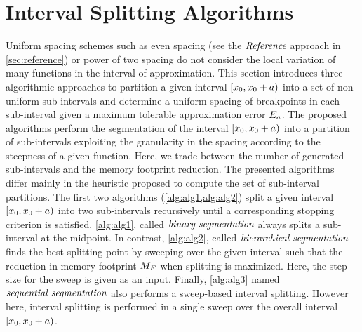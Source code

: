 \section{Interval Splitting Algorithms}
\label{sec:proposed}
Uniform spacing schemes such as even spacing (see the $\textit{Reference}$ approach in \cref{sec:reference}) or power of two spacing do not consider the local variation of many functions in the interval of approximation.
This section introduces three algorithmic approaches to  partition a given interval $[x_{0},x_{0}+a)$ into a set of non-uniform sub-intervals and determine a uniform spacing of breakpoints in each sub-interval given a maximum tolerable approximation error $E_a$.
The proposed algorithms perform the segmentation of the interval $[x_{0},x_{0}+a)$ into a partition of sub-intervals exploiting the granularity in the spacing according to the steepness of a given function.
Here, we trade between the number of generated sub-intervals and the memory footprint reduction.
The presented algorithms differ mainly in the heuristic proposed to compute the set of sub-interval partitions.
The first two algorithms (\cref{alg:alg1,alg:alg2}) split a given interval $[x_{0},x_{0}+a)$ into two sub-intervals recursively until a corresponding stopping criterion is satisfied. 
\cref{alg:alg1}, called $\textit{binary segmentation}$ always splits a sub-interval at the midpoint.
In contrast, \cref{alg:alg2}, called $\textit{hierarchical segmentation}$ finds the best splitting point by sweeping over the given interval such that the reduction in memory footprint $M_{F}$ when splitting is maximized. 
Here, the step size for the sweep is given as an input.
Finally, \cref{alg:alg3} named $\textit{sequential segmentation}$ also performs a sweep-based interval splitting. 
However here, interval splitting is performed in a single sweep over the overall interval $[x_{0},x_{0}+a)$.
\newlength{\commentWidth}
\setlength{\commentWidth}{7cm}
\newcommand{\atcp}[1]{\tcp*[r]{\makebox[\commentWidth]{#1\hfill}}}
